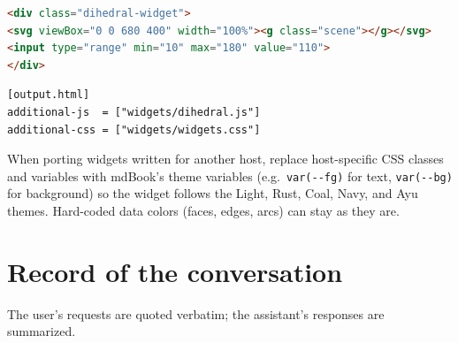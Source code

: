 \documentclass[11pt]{article}
\theoremstyle{definition}
\theoremstyle{remark}
\begin{document}
\begin{lstlisting}[language=HTML,title={Chapter snippet (option 2)}]
<div class="dihedral-widget">
<svg viewBox="0 0 680 400" width="100%"><g class="scene"></g></svg>
<input type="range" min="10" max="180" value="110">
</div>
\end{lstlisting}

\begin{lstlisting}[title={book.toml}]
[output.html]
additional-js  = ["widgets/dihedral.js"]
additional-css = ["widgets/widgets.css"]
\end{lstlisting}

When porting widgets written for another host, replace host-specific CSS classes and variables
with mdBook's theme variables (e.g.\ \verb|var(--fg)| for text, \verb|var(--bg)| for background) so the
widget follows the Light, Rust, Coal, Navy, and Ayu themes. Hard-coded data colors (faces, edges,
arcs) can stay as they are.

\appendix
\section{Record of the conversation}
\label{app:conversation}

The user's requests are quoted verbatim; the assistant's responses are summarized.
\end{document}
